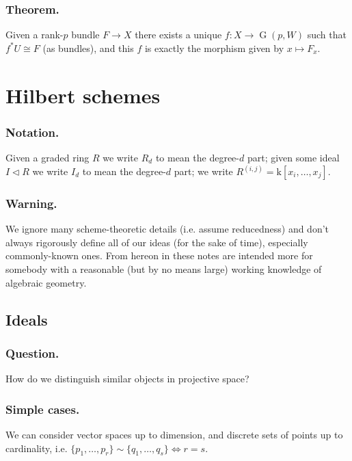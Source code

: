 \documentclass[10pt]{article}
\numberwithin{equation}{subsubsection}
\DeclareMathOperator{\G}{G}
\renewcommand{\k}{\mathrm{k}}
\begin{document}
            \subsubsection{Theorem.} Given a rank-$p$ bundle $F\to X$ there exists a unique $f\colon X\to\G(p,W)$ such that $f^*U\cong F$ (as bundles), and this $f$ is exactly the morphism given by $x\mapsto F_x$.
    
    \section{Hilbert schemes}
    
            \subsubsection{Notation.} Given a graded ring $R$ we write $R_d$ to mean the degree-$d$ part; given some ideal $I\triangleleft R$ we write $I_d$ to mean the degree-$d$ part; we write $R^{(i,j)}=\k[x_i,\ldots,x_j]$.
            
            \subsubsection{Warning.} We ignore many scheme-theoretic details (i.e. assume reducedness) and don't always rigorously define all of our ideas (for the sake of time), especially commonly-known ones. From hereon in these notes are intended more for somebody with a reasonable (but by no means large) working knowledge of algebraic geometry.
    
        \subsection{Ideals}
        
            \subsubsection{Question.}\label{identification-question} How do we distinguish similar objects in projective space?
            
            \subsubsection{Simple cases.} We can consider vector spaces up to dimension, and discrete sets of points up to cardinality, i.e. $\{p_1,\ldots,p_r\}\sim\{q_1,\ldots,q_s\}\iff r=s$.
            
\end{document}
